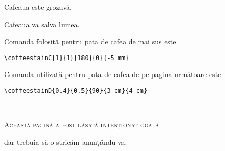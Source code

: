 \documentclass[a4paper, 11pt, BCOR = 0 pt, oneside]{scrartcl}
\begin{document}
Cafeaua este grozavă.

\vspace{5mm}

\noindent
Cafeaua va salva lumea.

\vfill{}

\begin{tcolorbox}
  Comanda folosită pentru pata de cafea de mai sus este

  \verb|\coffeestainC{1}{1}{180}{0}{-5 mm}|
\end{tcolorbox}

\begin{tcolorbox}
Comanda utilizată pentru pata de cafea de pe pagina următoare este

  \verb|\coffeestainD{0.4}{0.5}{90}{3 cm}{4 cm}|
\end{tcolorbox}

\newpage{}
\pagestyle{empty}
~\\

\label{stainD}

\vfill{}
\begin{center}
\textsc{Această pagină a fost lăsată intenționat goală}

dar trebuia să o stricăm anunțându-vă.
\end{center}

\vfill{}
\end{document}
